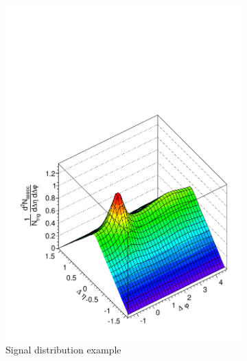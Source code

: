 \begin{figure}[htbp]
  \centering
  \begin{subfigure}[b]{0.5\textwidth}
    \includegraphics[width=\textwidth]{figures/example_signal.pdf}
    \caption{Signal distribution example}
    \label{fig:example_signal}
  \end{subfigure}%
  \begin{subfigure}[b]{0.5\textwidth}

\end{subfigure}
\end{figure}
